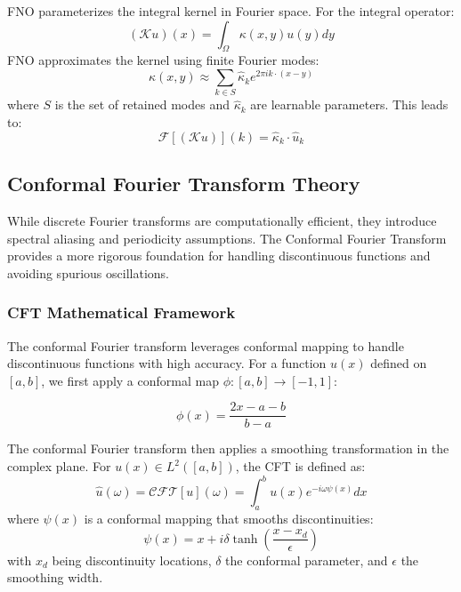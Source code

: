 \documentclass[11pt,twocolumn]{article}
\newcommand{\F}{\mathcal{F}}
\newcommand{\K}{\mathcal{K}}
\begin{document}
FNO parameterizes the integral kernel in Fourier space. For the integral operator:
\begin{equation}
(\K u)(x) = \int_\Omega \kappa(x, y) u(y) dy
\end{equation}
FNO approximates the kernel using finite Fourier modes:
\begin{equation}
\kappa(x, y) \approx \sum_{k \in S} \hat{\kappa}_k e^{2\pi i k \cdot (x-y)}
\end{equation}
where $S$ is the set of retained modes and $\hat{\kappa}_k$ are learnable parameters. This leads to:
\begin{equation}
\F[(\K u)](k) = \hat{\kappa}_k \cdot \hat{u}_k
\end{equation}

\subsection{Conformal Fourier Transform Theory}

While discrete Fourier transforms are computationally efficient, they introduce spectral aliasing and periodicity assumptions. The Conformal Fourier Transform \citep{barnett2010conformal} provides a more rigorous foundation for handling discontinuous functions and avoiding spurious oscillations.

\subsubsection{CFT Mathematical Framework}

The conformal Fourier transform leverages conformal mapping to handle discontinuous functions with high accuracy. For a function $u(x)$ defined on $[a,b]$, we first apply a conformal map $\phi: [a,b] \to [-1,1]$:

\begin{equation}
\phi(x) = \frac{2x - a - b}{b - a}
\end{equation}

The conformal Fourier transform then applies a smoothing transformation in the complex plane. For $u(x) \in L^2([a,b])$, the CFT is defined as:
\begin{equation}
\hat{u}(\omega) = \mathcal{CFT}[u](\omega) = \int_{a}^{b} u(x) e^{-i\omega \psi(x)} dx
\end{equation}
where $\psi(x)$ is a conformal mapping that smooths discontinuities:
\begin{equation}
\psi(x) = x + i\delta \tanh\left(\frac{x - x_d}{\epsilon}\right)
\end{equation}
with $x_d$ being discontinuity locations, $\delta$ the conformal parameter, and $\epsilon$ the smoothing width.
\end{document}
